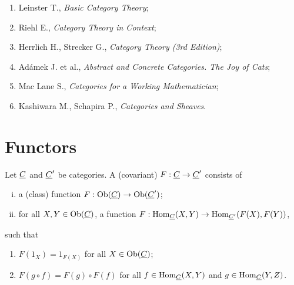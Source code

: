 
\begin{enumerate}
	\item Leinster T., \textit{Basic Category Theory};
	\item Riehl E., \textit{Category Theory in Context};
	\item Herrlich H., Strecker G., \textit{Category Theory (3rd Edition)};
	\item Ad\'amek J. et al., \textit{Abstract and Concrete Categories. The Joy of Cats};
	\item Mac Lane S., \textit{Categories for a Working Mathematician};
	\item Kashiwara M., Schapira P., \textit{Categories and Sheaves}.
\end{enumerate}

\section{Functors}

\begin{definition*}
	Let \( \underline{C} \) and \( \underline{C}' \) be categories. A (covariant)  \( F: \underline{C} \to \underline{C}' \) consists of
	\begin{enumerate}[(i)]
		\item a (class) function \( F: \operatorname{Ob}(\underline{C}) \to \operatorname{Ob}(\underline{C}') \);
		\item for all \( X, Y \in \operatorname{Ob}(\underline{C}) \), a function \( F: \operatorname{Hom}_{\underline{C}}(X, Y) \to \operatorname{Hom}_{\underline{C}'}(F(X), F(Y)) \),
	\end{enumerate}
	such that
	\begin{enumerate}
		\item \( F(1_X) = 1_{F(X)} \) for all \( X \in \operatorname{Ob}(\underline{C}) \);
		\item \( F(g \circ f) = F(g) \circ F(f) \) for all \( f \in \operatorname{Hom}_{\underline{C}}(X, Y) \) and \( g \in \operatorname{Hom}_{\underline{C}}(Y, Z) \).
	\end{enumerate}
\end{definition*}

